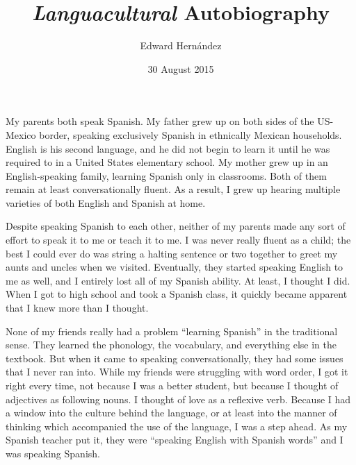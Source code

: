 \documentclass[man,12pt,natbib]{apa6}
\begin{document}
\title{\textit{Languacultural} Autobiography}
\author{Edward Hern\'{a}ndez}
\date{30 August 2015}
\maketitle

My parents both speak Spanish. My father grew up on both sides of the US-Mexico
border, speaking exclusively Spanish in ethnically Mexican households. English
is his second language, and he did not begin to learn it until he was required
to in a United States elementary school. My mother grew up in an
English-speaking family, learning Spanish only in classrooms. Both of them
remain at least conversationally fluent. As a result, I grew up hearing
multiple varieties of both English and Spanish at home.

Despite speaking Spanish to each other, neither of my parents made any sort of
effort to speak it to me or teach it to me. I was never really fluent as a
child; the best I could ever do was string a halting sentence or two together
to greet my aunts and uncles when we visited. Eventually, they started speaking
English to me as well, and I entirely lost all of my Spanish ability. At least,
I thought I did. When I got to high school and took a Spanish class, it quickly
became apparent that I knew more than I thought.

None of my friends really had a problem ``learning Spanish'' in the traditional
sense.  They learned the phonology, the vocabulary, and everything else in the
textbook. But when it came to speaking conversationally, they had some issues
that I never ran into.  While my friends were struggling with word order, I got
it right every time, not because I was a better student, but because I thought
of adjectives as following nouns. I thought of love as a reflexive verb.
Because I had a window into the culture behind the language, or at least into
the manner of thinking which accompanied the use of the language, I was a step
ahead. As my Spanish teacher put it, they were ``speaking English with Spanish
words'' and I was speaking Spanish.
\end{document}
